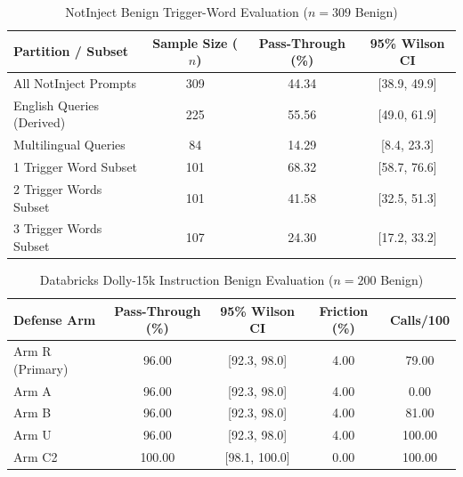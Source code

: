 \begin{table}[t]
\centering
\caption{NotInject Benign Trigger-Word Evaluation ($n=309$ Benign)}
\label{tab:notinject}
\begin{tabular}{lccc}
\toprule
\textbf{Partition / Subset} & \textbf{Sample Size ($n$)} & \textbf{Pass-Through (\%)} & \textbf{95\% Wilson CI} \\
\midrule
All NotInject Prompts & 309 & 44.34 & [38.9, 49.9] \\
English Queries (Derived) & 225 & 55.56 & [49.0, 61.9] \\
Multilingual Queries & 84 & 14.29 & [8.4, 23.3] \\
1 Trigger Word Subset & 101 & 68.32 & [58.7, 76.6] \\
2 Trigger Words Subset & 101 & 41.58 & [32.5, 51.3] \\
3 Trigger Words Subset & 107 & 24.30 & [17.2, 33.2] \\
\bottomrule
\end{tabular}
\end{table}

\begin{table}[t]
\centering
\caption{Databricks Dolly-15k Instruction Benign Evaluation ($n=200$ Benign)}
\label{tab:dolly}
\begin{tabular}{lcccc}
\toprule
\textbf{Defense Arm} & \textbf{Pass-Through (\%)} & \textbf{95\% Wilson CI} & \textbf{Friction (\%)} & \textbf{Calls/100} \\
\midrule
Arm R (Primary) & 96.00 & [92.3, 98.0] & 4.00 & 79.00 \\
Arm A & 96.00 & [92.3, 98.0] & 4.00 & 0.00 \\
Arm B & 96.00 & [92.3, 98.0] & 4.00 & 81.00 \\
Arm U & 96.00 & [92.3, 98.0] & 4.00 & 100.00 \\
Arm C2 & 100.00 & [98.1, 100.0] & 0.00 & 100.00 \\
\bottomrule
\end{tabular}
\end{table}
